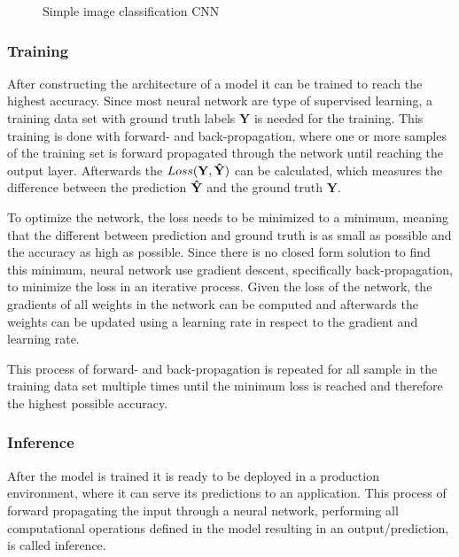 \begin{figure}[!htb]
    \centering
    \resizebox{.95\linewidth}{!}{}
    \caption{Simple image classification CNN}
    \label{fig:simpleCNN}
\end{figure}

\subsubsection{Training}

After constructing the architecture of a model it can be trained to reach the highest accuracy.
Since most neural network are type of supervised learning, a training data set with ground truth labels $\mathbf{Y}$ is needed for the training.
This training is done with forward- and back-propagation, where one or more samples of the training set is forward propagated through the network until reaching the output layer. Afterwards the $Loss\mathbf{(Y,\Hat{Y})}$ can be calculated, which measures the difference between the prediction $\mathbf{\Hat{Y}}$ and the ground truth $\mathbf{Y}$.

To optimize the network, the loss needs to be minimized to a minimum, meaning that the different between prediction and ground truth is as small as possible and the accuracy as high as possible.
Since there is no closed form solution to find this minimum, neural network use gradient descent, specifically back-propagation, to minimize the loss in an iterative process.
Given the loss of the network, the gradients of all weights in the network can be computed and afterwards the weights can be updated using a learning rate in respect to the gradient and learning rate.

This process of forward- and back-propagation is repeated for all sample in the training data set multiple times until the minimum loss is reached and therefore the highest possible accuracy.

\subsubsection{Inference}

After the model is trained it is ready to be deployed in a production environment, where it can serve its predictions to an application. This process of forward propagating the input through a neural network, performing all computational operations defined in the model resulting in an output/prediction, is called inference.

